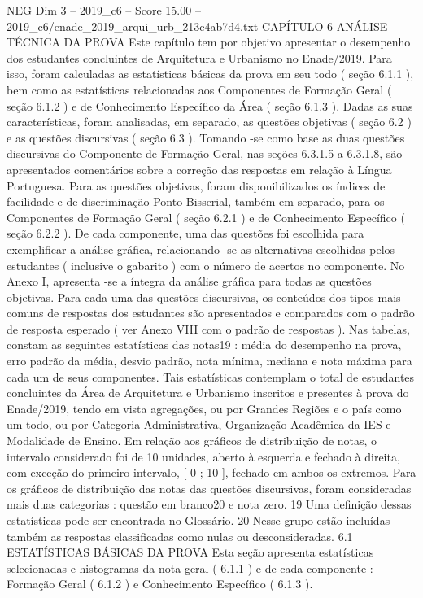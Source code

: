 \begin{textsample}{NEG Dim 3 – 2019\_c6 – Score 15.00 – 2019\_c6/enade\_2019\_arqui\_urb\_213c4ab7d4.txt}  \label{ex:f3_neg_271}
CAPÍTULO 6 ANÁLISE TÉCNICA DA PROVA Este capítulo tem por objetivo apresentar o desempenho dos estudantes concluintes de Arquitetura e Urbanismo no Enade/2019.
Para isso, foram calculadas as estatísticas básicas da prova em seu todo ( seção 6.1.1 ), bem como as estatísticas relacionadas aos Componentes de Formação Geral ( seção 6.1.2 ) e de Conhecimento Específico da Área ( seção 6.1.3 ).
Dadas as suas características, foram analisadas, em separado, as questões objetivas ( seção 6.2 ) e as questões discursivas ( seção 6.3 ).
Tomando -se como base as duas questões discursivas do Componente de Formação Geral, nas seções 6.3.1.5 a 6.3.1.8, são apresentados comentários sobre a correção das respostas em relação à Língua Portuguesa.
Para as questões objetivas, foram disponibilizados os índices de facilidade e de discriminação Ponto-Bisserial, também em separado, para os Componentes de Formação Geral ( seção 6.2.1 ) e de Conhecimento Específico ( seção 6.2.2 ).
De cada componente, uma das questões foi escolhida para exemplificar a análise gráfica, relacionando -se as alternativas escolhidas pelos estudantes ( inclusive o gabarito ) com o número de acertos no componente.
No Anexo I, apresenta -se a íntegra da análise gráfica para todas as questões objetivas.
Para cada uma das questões discursivas, os conteúdos dos tipos mais comuns de respostas dos estudantes são apresentados e comparados com o padrão de resposta esperado ( ver Anexo VIII com o padrão de respostas ).
Nas tabelas, constam as seguintes estatísticas das notas19 : média do desempenho na prova, erro padrão da média, desvio padrão, nota mínima, mediana e nota máxima para cada um de seus componentes.
Tais estatísticas contemplam o total de estudantes concluintes da Área de Arquitetura e Urbanismo inscritos e presentes à prova do Enade/2019, tendo em vista agregações, ou por Grandes Regiões e o país como um todo, ou por Categoria Administrativa, Organização Acadêmica da IES e Modalidade de Ensino.
Em relação aos gráficos de distribuição de notas, o intervalo considerado foi de 10 unidades, aberto à esquerda e fechado à direita, com exceção do primeiro intervalo, [ 0 ; 10 ], fechado em ambos os extremos.
Para os gráficos de distribuição das notas das questões discursivas, foram consideradas mais duas categorias : questão em branco20 e nota zero. 19 Uma definição dessas estatísticas pode ser encontrada no Glossário. 20 Nesse grupo estão incluídas também as respostas classificadas como nulas ou desconsideradas. 6.1 ESTATÍSTICAS BÁSICAS DA PROVA Esta seção apresenta estatísticas selecionadas e histogramas da nota geral ( 6.1.1 ) e de cada componente : Formação Geral ( 6.1.2 ) e Conhecimento Específico ( 6.1.3 ).

\end{textsample}
